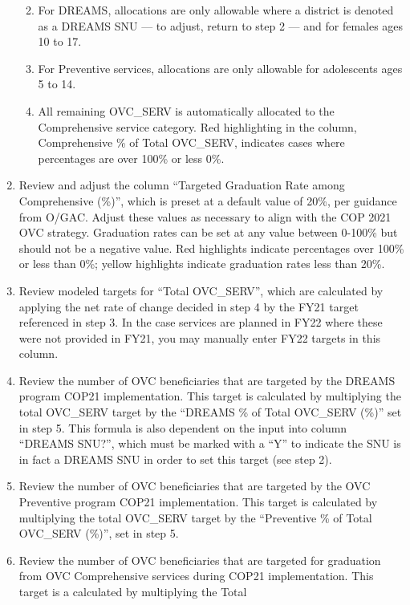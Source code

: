 \documentclass[
  openany]{book}
\begin{document}
\begin{enumerate}
  \begin{enumerate}
  \def\labelenumii{\alph{enumii}.}
  \item
    For DREAMS, allocations are only allowable where a district is
    denoted as a DREAMS SNU --- to adjust, return to step 2 --- and
    for females ages 10 to 17.
  \item
    For Preventive services, allocations are only allowable for
    adolescents ages 5 to 14.
  \item
    All remaining OVC\_SERV is automatically allocated to the
    Comprehensive service category. Red highlighting in the column,
    Comprehensive \% of Total OVC\_SERV, indicates cases where
    percentages are over 100\% or less 0\%.
  \end{enumerate}
\item
  Review and adjust the column ``Targeted Graduation Rate among
  Comprehensive (\%)'', which is preset at a default value of 20\%, per
  guidance from O/GAC. Adjust these values as necessary to align with
  the COP 2021 OVC strategy. Graduation rates can be set at any value
  between 0-100\% but should not be a negative value. Red highlights
  indicate percentages over 100\% or less than 0\%; yellow highlights
  indicate graduation rates less than 20\%.
\item
  Review modeled targets for ``Total OVC\_SERV'', which are calculated by
  applying the net rate of change decided in step 4 by the FY21 target
  referenced in step 3. In the case services are planned in FY22 where
  these were not provided in FY21, you may manually enter FY22 targets
  in this column.
\item
  Review the number of OVC beneficiaries that are targeted by the
  DREAMS program COP21 implementation. This target is calculated by
  multiplying the total OVC\_SERV target by the ``DREAMS \% of Total
  OVC\_SERV (\%)'' set in step 5. This formula is also dependent on the
  input into column ``DREAMS SNU?'', which must be marked with a ``Y'' to
  indicate the SNU is in fact a DREAMS SNU in order to set this target
  (see step 2).
\item
  Review the number of OVC beneficiaries that are targeted by the OVC
  Preventive program COP21 implementation. This target is calculated
  by multiplying the total OVC\_SERV target by the ``Preventive \% of
  Total OVC\_SERV (\%)'', set in step 5.
\item
  Review the number of OVC beneficiaries that are targeted for
  graduation from OVC Comprehensive services during COP21
  implementation. This target is a calculated by multiplying the Total

\end{enumerate}
\end{document}
